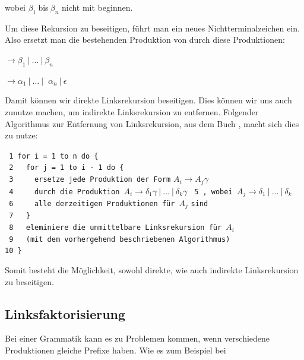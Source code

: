 \noindent wobei $\beta_1\ $bis$\ \beta_n$ nicht mit 
beginnen.\vspace{10pt}

\noindent Um diese Rekursion zu beseitigen, führt man ein neues
Nichtterminalzeichen  ein. Also ersetzt man die
bestehenden Produktion von
 durch diese Produktionen:\vspace{10pt}

 $\to \beta_1\ |\ \ldots\ |\ \beta_n$

 $\to \alpha_1$$\ |\ \ldots\ |\
$ $\alpha_n$$\ |\ \epsilon$\vspace{10pt}

\noindent Damit können wir direkte Linksrekursion beseitigen. Dies können wir
uns auch zunutze machen, um indirekte Linksrekursion zu entfernen. Folgender
Algorithmus zur Entfernung von Linksrekursion, aus dem Buch \cite{Compilers},
macht sich dies zu nutze:\vspace{10pt}

\noindent
\verb| 1 for i = 1 to n do {|\\
\verb| 2   for j = 1 to i - 1 do {|\\
\verb| 3     ersetze jede Produktion der Form| $A_i \to A_j \gamma$ \verb| |\\ 
\verb| 4     durch die Produktion |$A_i \to \delta_1\gamma\ |\ \ldots\ |\ \delta_k\gamma$
\verb| 5 , wobei |$A_j \to \delta_1\ |\ \ldots\ |\ \delta_k$\\ 
\verb| 6     alle derzeitigen Produktionen für |$A_j$ \verb|sind|\\ 
\verb| 7   }|\\
\verb| 8   eleminiere die unmittelbare Linksrekursion für |$A_i$\\
\verb| 9   (mit dem vorhergehend beschriebenen Algorithmus)|\\
\verb|10 }|
\vspace{10pt}

Somit besteht die Möglichkeit, sowohl direkte, wie auch indirekte Linksrekursion
zu beseitigen.\vspace{10pt}


\subsection{Linksfaktorisierung}\label{PerspectiveLeftfactorisation}

Bei einer Grammatik kann es zu Problemen kommen, wenn verschiedene Produktionen
gleiche Prefixe haben. Wie es zum Beispiel bei \vspace{10pt}

